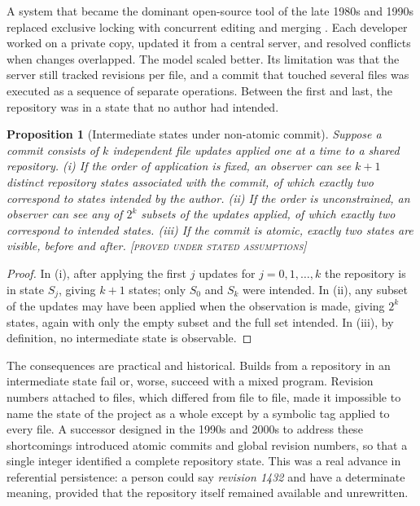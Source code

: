 \documentclass[11pt,twoside,openright]{book}
\theoremstyle{plain}
\newtheorem{proposition}[theorem]{Proposition}
\theoremstyle{definition}
\theoremstyle{remark}
\newcommand{\Proved}{\textup{\textsc{[proved under stated assumptions]}}}
\begin{document}
A system that became the dominant open-source tool of the late 1980s and 1990s replaced exclusive locking with concurrent editing and merging \cite{berliner1990}. Each developer worked on a private copy, updated it from a central server, and resolved conflicts when changes overlapped. The model scaled better. Its limitation was that the server still tracked revisions per file, and a commit that touched several files was executed as a sequence of separate operations. Between the first and last, the repository was in a state that no author had intended.

\begin{proposition}[Intermediate states under non-atomic commit]\label{prop:atomic}
Suppose a commit consists of $k$ independent file updates applied one at a time to a shared repository. (i) If the order of application is fixed, an observer can see $k+1$ distinct repository states associated with the commit, of which exactly two correspond to states intended by the author. (ii) If the order is unconstrained, an observer can see any of $2^k$ subsets of the updates applied, of which exactly two correspond to intended states. (iii) If the commit is atomic, exactly two states are visible, before and after.
\Proved{}
\end{proposition}

\begin{proof}
In (i), after applying the first $j$ updates for $j=0,1,\dots,k$ the repository is in state $S_j$, giving $k+1$ states; only $S_0$ and $S_k$ were intended. In (ii), any subset of the updates may have been applied when the observation is made, giving $2^k$ states, again with only the empty subset and the full set intended. In (iii), by definition, no intermediate state is observable.
\end{proof}

The consequences are practical and historical. Builds from a repository in an intermediate state fail or, worse, succeed with a mixed program. Revision numbers attached to files, which differed from file to file, made it impossible to name the state of the project as a whole except by a symbolic tag applied to every file. A successor designed in the 1990s and 2000s to address these shortcomings introduced atomic commits and global revision numbers, so that a single integer identified a complete repository state. This was a real advance in referential persistence: a person could say \emph{revision 1432} and have a determinate meaning, provided that the repository itself remained available and unrewritten.
\end{document}
